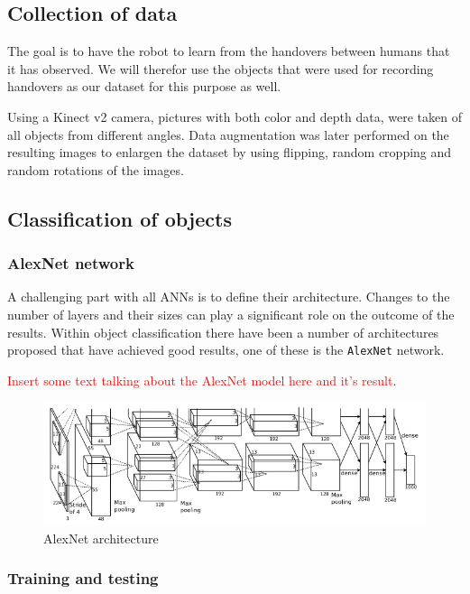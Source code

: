 \subsection{Collection of data}

The goal is to have the robot to learn from the handovers between humans that it has observed. We will therefor use the objects that were used for recording handovers as our dataset for this purpose as well.

Using a Kinect v2 camera, pictures with both color and depth data, were taken of all objects from different angles. Data augmentation was later performed on the resulting images to enlargen the dataset by using flipping, random cropping and random rotations of the images.

\subsection{Classification of objects}

\subsubsection{AlexNet network}

A challenging part with all ANNs is to define their architecture. Changes to the number of layers and their sizes can play a significant role on the outcome of the results. Within object classification there have been a number of architectures proposed that have achieved good results, one of these is the \texttt{AlexNet} network.

\textcolor{red}{Insert some text talking about the AlexNet model here and it's result}.

\begin{figure}
	\centering
	\includegraphics[width=\textwidth]{img/methods/alexnet_original.png}
	\caption{AlexNet architecture}
	\label{fig:alexnet_orig}
\end{figure}


\subsubsection{Training and testing}

